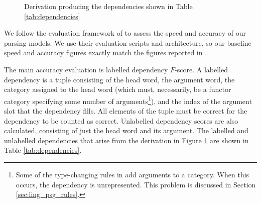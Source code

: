 \begin{figure}
\centering
\caption{Derivation producing the dependencies shown in Table
\ref{tab:dependencies}\label{fig:dependencies}}
\end{figure}


We follow the \ccgbank evaluation framework of \citet{clark:cl07} to assess the
speed and accuracy of our parsing models. We use their evaluation scripts and
architecture, so our baseline speed and accuracy figures exactly match the
figures reported in \citet{clark:cl07}.

The main accuracy evaluation is labelled dependency $F$-score. A \ccgbank
labelled dependency is a tuple consisting of the head word, the argument word,
the category assigned to the head word (which must, necessarily, be a functor
category specifying some number of arguments\footnote{Some of the type-changing rules in
\ccgbank add arguments to a category. When this occurs, the dependency is
unrepresented. This problem is discussed in Section \ref{sec:ling_psg_rules}.}),
and the index of the argument slot that the dependency fills. All elements of
the tuple must be correct for the dependency to be counted as correct.
Unlabelled dependency scores are also calculated, consisting of just the head
word and its argument. The labelled and unlabelled dependencies that arise from
the derivation in Figure \ref{fig:dependencies} are shown in Table
\ref{tab:dependencies}.

